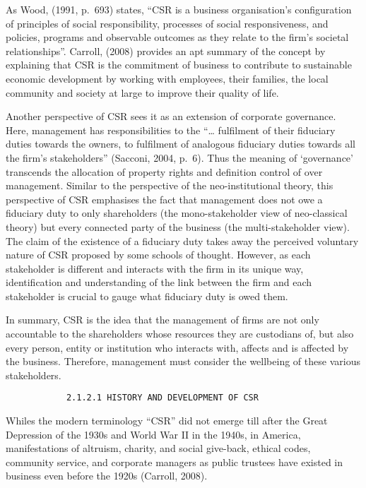\documentclass[
]{mitthesis}
\begin{document}
As Wood, (1991, p.~693) states, ``CSR is a business organisation's configuration of principles of social responsibility, processes of social responsiveness, and policies, programs and observable outcomes as they relate to the firm's societal relationships''. Carroll, (2008) provides an apt summary of the concept by explaining that CSR is the commitment of business to contribute to sustainable economic development by working with employees, their families, the local community and society at large to improve their quality of life.

Another perspective of CSR sees it as an extension of corporate governance. Here, management has responsibilities to the ``\ldots{} fulfilment of their fiduciary duties towards the owners, to fulfilment of analogous fiduciary duties towards all the firm's stakeholders'' (Sacconi, 2004, p.~6). Thus the meaning of `governance' transcends the allocation of property rights and definition control of over management. Similar to the perspective of the neo-institutional theory, this perspective of CSR emphasises the fact that management does not owe a fiduciary duty to only shareholders (the mono-stakeholder view of neo-classical theory) but every connected party of the business (the multi-stakeholder view). The claim of the existence of a fiduciary duty takes away the perceived voluntary nature of CSR proposed by some schools of thought. However, as each stakeholder is different and interacts with the firm in its unique way, identification and understanding of the link between the firm and each stakeholder is crucial to gauge what fiduciary duty is owed them.

In summary, CSR is the idea that the management of firms are not only accountable to the shareholders whose resources they are custodians of, but also every person, entity or institution who interacts with, affects and is affected by the business. Therefore, management must consider the wellbeing of these various stakeholders.

\begin{verbatim}
            2.1.2.1 HISTORY AND DEVELOPMENT OF CSR
\end{verbatim}

Whiles the modern terminology ``CSR'' did not emerge till after the Great Depression of the 1930s and World War II in the 1940s, in America, manifestations of altruism, charity, and social give-back, ethical codes, community service, and corporate managers as public trustees have existed in business even before the 1920s (Carroll, 2008).
\end{document}

